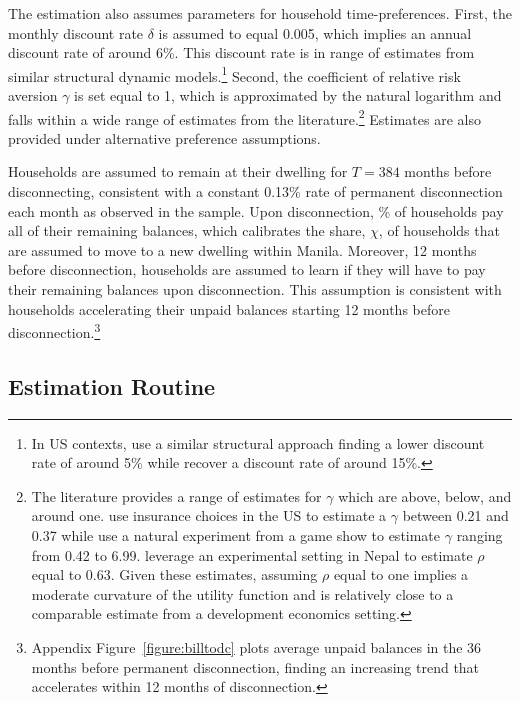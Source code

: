 \documentclass[12pt,table]{article}
\begin{document}
The estimation also assumes parameters for household time-preferences.  First, the monthly discount rate $\delta$ is assumed to equal 0.005, which implies an annual discount rate of around 6\%. This discount rate is in range of estimates from similar structural dynamic models.\footnote{In US contexts, \cite{gourinchas2002consumption} use a similar structural approach finding a lower discount rate of around 5\% while \cite{laibson2007estimating} recover a discount rate of around 15\%.}  Second, the coefficient of relative risk aversion $\gamma$ is set equal to 1, which is approximated by the natural logarithm and falls within a wide range of estimates from the literature.\footnote{The literature provides a range of estimates for $\gamma$ which are above, below, and around one.  \cite{barseghyan2013nature} use insurance choices in the US to estimate a $\gamma$ between 0.21 and 0.37 while  \cite{beetsma2001measuring} use a natural experiment from a game show to estimate $\gamma$ ranging from 0.42 to 6.99.  \cite{carvalho2016effect} leverage an experimental setting in Nepal to estimate $\rho$ equal to 0.63.  Given these estimates, assuming $\rho$ equal to one implies a moderate curvature of the utility function and is relatively close to a comparable estimate from a development economics setting.}  Estimates are also provided under alternative preference assumptions.

Households are assumed to remain at their dwelling for $T=384$ months before disconnecting, consistent with a constant 0.13\% rate of permanent disconnection each month as observed in the sample.  Upon disconnection, \unskip\% of households pay all of their remaining balances, which calibrates the share, $\chi$, of households that are assumed to move to a new dwelling within Manila.  Moreover, 12 months before disconnection, households are assumed to learn if they will have to pay their remaining balances upon disconnection.  This assumption is consistent with households accelerating their unpaid balances starting 12 months before disconnection.\footnote{Appendix Figure~\ref{figure:billtodc} plots average unpaid balances in the 36 months before permanent disconnection, finding an increasing trend that accelerates within 12 months of disconnection.}

\subsection{Estimation Routine}\label{section:estimationroutine}
\end{document}
